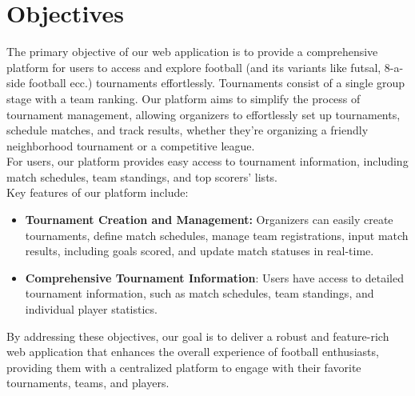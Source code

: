 \section{Objectives}

The primary objective of our web application is to provide a comprehensive platform for users to access and explore football (and its variants like futsal, 8-a-side football ecc.) tournaments effortlessly. Tournaments consist of a single group stage with a team ranking. Our platform aims to simplify the process of tournament management, allowing organizers to effortlessly set up tournaments, schedule matches, and track results, whether they're organizing a friendly neighborhood tournament or a competitive league.\\
For users, our platform provides easy access to tournament information, including match schedules, team standings, and top scorers' lists. \\
Key features of our platform include:
\begin{itemize}
    \item \textbf{Tournament Creation and Management:} Organizers can easily create tournaments, define match schedules, manage team registrations, input match results, including goals scored, and update match statuses in real-time.
    \item \textbf{Comprehensive Tournament Information}: Users have access to detailed tournament information, such as match schedules, team standings, and individual player statistics.
\end{itemize}

\noindent By addressing these objectives, our goal is to deliver a robust and feature-rich web application that enhances the overall experience of football enthusiasts, providing them with a centralized platform to engage with their favorite tournaments, teams, and players.